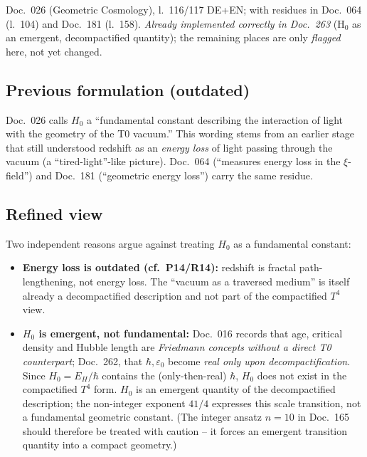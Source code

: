 Doc.~026 (Geometric Cosmology), l.~116/117 DE+EN; with residues in Doc.~064
(l.~104) and Doc.~181 (l.~158). \emph{Already implemented correctly in
Doc.~263} (H$_0$ as an emergent, decompactified quantity); the remaining
places are only \emph{flagged} here, not yet changed.

\subsection*{Previous formulation (outdated)}

Doc.~026 calls $H_0$ a \enquote{fundamental constant describing the interaction
of light with the geometry of the T0 vacuum.} This wording stems from an
earlier stage that still understood redshift as an \emph{energy loss} of light
passing through the vacuum (a \enquote{tired-light}-like picture). Doc.~064
(\enquote{measures energy loss in the $\xi$-field}) and Doc.~181
(\enquote{geometric energy loss}) carry the same residue.

\subsection*{Refined view}

Two independent reasons argue against treating $H_0$ as a fundamental constant:
\begin{itemize}
  \item \textbf{Energy loss is outdated (cf.\ P14/R14):} redshift is fractal
        path-lengthening, not energy loss. The \enquote{vacuum as a traversed
        medium} is itself already a decompactified description and not part of
        the compactified $T^4$ view.
  \item \textbf{$H_0$ is emergent, not fundamental:} Doc.~016 records that age,
        critical density and Hubble length are \emph{Friedmann concepts without
        a direct T0 counterpart}; Doc.~262, that $\hbar, \varepsilon_0$ become
        \emph{real only upon decompactification}. Since $H_0 = E_H/\hbar$
        contains the (only-then-real) $\hbar$, $H_0$ does not exist in the
        compactified $T^4$ form. $H_0$ is an emergent quantity of the
        decompactified description; the non-integer exponent $41/4$ expresses
        this scale transition, not a fundamental geometric constant. (The
        integer ansatz $n=10$ in Doc.~165 should therefore be treated with
        caution -- it forces an emergent transition quantity into a compact
        geometry.)
\end{itemize}

